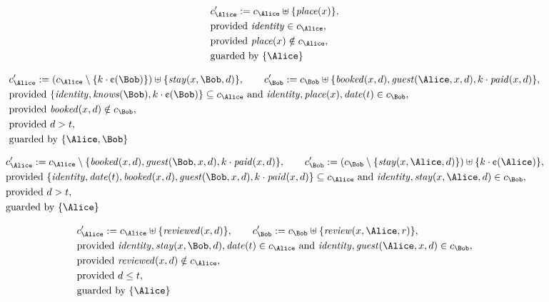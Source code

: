 \begin{align*}
&
c'_
{
\Alice
}
 := 
c_
{
\Alice
}
 \uplus 
\{
\mathit{
place
}
(
x
)
\}
,\\
&
\text{provided } 
\mathit{
identity
}
 \in c_
{
\Alice
}
,\\
&
\text{provided } 
\mathit{
place
}
(
x
)
 \notin c_
{
\Alice
}
,\\
&
\text{guarded by } \{
\Alice
\}
\end{align*}

\begin{align*}
&
c'_
{
\Alice
}
 := 
(c_
{
\Alice
}
 \setminus 
\{
k
\cdot
\text{\textcent}
(
\Bob
)
\}
) \uplus 
\{
\mathit{
stay
}
(
x
,
\Bob
,
d
)
\}
, \qquad 
c'_
{
\Bob
}
 := 
c_
{
\Bob
}
 \uplus 
\{
\mathit{
booked
}
(
x
,
d
)
,
\mathit{
guest
}
(
\Alice
,
x
,
d
)
,
k
\cdot
\mathit{
paid
}
(
x
,
d
)
\}
,\\
&
\text{provided } 
\{
\mathit{
identity
}
,
\mathit{
knows
}
(
\Bob
)
,
k
\cdot
\text{\textcent}
(
\Bob
)
\}
 \subseteq c_
{
\Alice
}
 \text{ and } 
\mathit{
identity
}
,
\mathit{
place
}
(
x
)
,
\mathit{
date
}
(
t
)
 \in c_
{
\Bob
}
,\\
&
\text{provided } 
\mathit{
booked
}
(
x
,
d
)
 \notin c_
{
\Bob
}
,\\
&
\text{provided } 
d
>
t
,\\
&
\text{guarded by } \{
\Alice
,
\Bob
\}
\end{align*}

\begin{align*}
&
c'_
{
\Alice
}
 := 
c_
{
\Alice
}
 \setminus 
\{
\mathit{
booked
}
(
x
,
d
)
,
\mathit{
guest
}
(
\Bob
,
x
,
d
)
,
k
\cdot
\mathit{
paid
}
(
x
,
d
)
\}
, \qquad 
c'_
{
\Bob
}
 := 
(c_
{
\Bob
}
 \setminus 
\{
\mathit{
stay
}
(
x
,
\Alice
,
d
)
\}
) \uplus 
\{
k
\cdot
\text{\textcent}
(
\Alice
)
\}
,\\
&
\text{provided } 
\{
\mathit{
identity
}
,
\mathit{
date
}
(
t
)
,
\mathit{
booked
}
(
x
,
d
)
,
\mathit{
guest
}
(
\Bob
,
x
,
d
)
,
k
\cdot
\mathit{
paid
}
(
x
,
d
)
\}
 \subseteq c_
{
\Alice
}
 \text{ and } 
\mathit{
identity
}
,
\mathit{
stay
}
(
x
,
\Alice
,
d
)
 \in c_
{
\Bob
}
,\\
&
\text{provided } 
d
>
t
,\\
&
\text{guarded by } \{
\Alice
\}
\end{align*}

\begin{align*}
&
c'_
{
\Alice
}
 := 
c_
{
\Alice
}
 \uplus 
\{
\mathit{
reviewed
}
(
x
,
d
)
\}
, \qquad 
c'_
{
\Bob
}
 := 
c_
{
\Bob
}
 \uplus 
\{
\mathit{
review
}
(
x
,
\Alice
,
r
)
\}
,\\
&
\text{provided } 
\mathit{
identity
}
,
\mathit{
stay
}
(
x
,
\Bob
,
d
)
,
\mathit{
date
}
(
t
)
 \in c_
{
\Alice
}
 \text{ and } 
\mathit{
identity
}
,
\mathit{
guest
}
(
\Alice
,
x
,
d
)
 \in c_
{
\Bob
}
,\\
&
\text{provided } 
\mathit{
reviewed
}
(
x
,
d
)
 \notin c_
{
\Alice
}
,\\
&
\text{provided } 
d
\le
t
,\\
&
\text{guarded by } \{
\Alice
\}
\end{align*}
